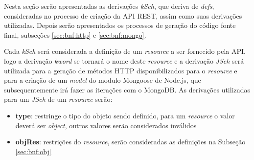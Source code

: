 Nesta seção serão apresentadas as derivações \textit{kSch}, que deriva de \textit{defs}, consideradas no processo de criação da API REST, assim como suas derivações utilizadas. Depois serão apresentados os processos de geração do código fonte final, subseções \ref{sec:bnf:http} e \ref{sec:bnf:mongo}.


\label{sec:bnf:ksch}

Cada \textit{kSch} será considerada a definição de um \textit{resource} a ser fornecido pela API, logo a derivação \textit{kword} se tornará o nome deste \textit{resource} e a derivação \textit{JSch} será utilizada para a geração de métodos HTTP disponibilizados para o \textit{resource} e para a criação de um \textit{model} do modulo Mongoose de Node.js, que subsequentemente irá fazer as iterações com o MongoDB. As derivações utilizadas para um \textit{JSch} de um \textit{resource} serão:
\begin{itemize}


    \item \textbf{type}: restringe o tipo do objeto sendo definido, para um \textit{resource} o valor deverá ser \textit{object}, outros valores serão considerados inválidos

    \item \textbf{objRes}: restrições do \textit{resource}, serão consideradas as definições na Subseção \ref{sec:bnf:obj}
\end{itemize}

